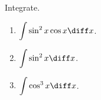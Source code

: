 Integrate.
\begin{enumerate}
\item $\displaystyle \int \sin^2 x \cos x\diff x$.

\item $\displaystyle \int \sin^2 x\diff x$.

\item $\displaystyle \int \cos^3 x\diff x$.

\end{enumerate}

